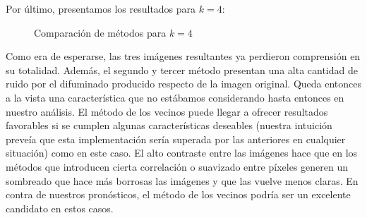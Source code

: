 Por último, presentamos los resultados para $k=4$:

\begin{figure}[H]
    \centering
    \qquad
    \qquad
    \caption{Comparación de métodos para $k = 4$}
    \label{fig:example}
\end{figure}

Como era de esperarse, las tres imágenes resultantes ya perdieron comprensión en su totalidad. Además, el segundo y tercer método presentan una alta cantidad de ruido por el difuminado producido respecto de la imagen original.
Queda entonces a la vista una característica que no estábamos considerando hasta entonces en nuestro análisis. El método de los vecinos puede llegar a ofrecer resultados favorables si se cumplen algunas características deseables (nuestra intuición preveía que esta implementación sería superada por las anteriores en cualquier situación) como en este caso. El alto contraste entre las imágenes hace que en los métodos que introducen cierta correlación o suavizado entre píxeles generen un sombreado que hace más borrosas las imágenes y que las vuelve menos claras. En contra de nuestros pronósticos, el método de los vecinos podría ser un excelente candidato en estos casos.



